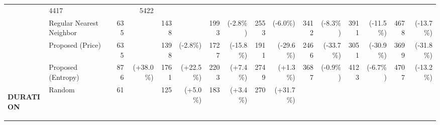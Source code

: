 \documentclass[onecolumn]{elsarticle}
\begin{document}
\begin{table}
{\begin{tabular}{l|l|r@{~}r|r@{~}r|r@{~}r|r@{~}r|r@{~}r|r@{~}r|r@{~}r|}
                                                    & \cellcolor{Gray}4417 & \cellcolor{Gray}
                                                    & \cellcolor{Gray}5422 & \cellcolor{Gray} \\
                        & Regular Nearest Neighbor  & 635  & 
                                                    & 1438 & 
                                                    & 1993 & {\color{green}(-2.8\%)} 
                                                    & 2553 & {\color{green}(-6.0\%)}
                                                    & 3412 & {\color{green}(-8.3\%)}
                                                    & 3911 & {\color{green}(-11.5\%)}
                                                    & 4678 & {\color{green}(-13.7\%)} \\
                                & Proposed (Price)   & 635  & 
                                                    & 1398 & {\color{green}(-2.8\%)}
                                                    & 1727 & {\color{green}(-15.8\%)}
                                                    & 1911 & {\color{green}(-29.6\%)}
                                                    & 2466 & {\color{green}(-33.7\%)}
                                                    & 3051 & {\color{green}(-30.9\%)}
                                                    & 3699 & {\color{green}(-31.8\%)} \\
                                & Proposed (Entropy)& 876 & {\color{red}(+38.0\%)} 
                                                    & 1761 & {\color{red}(+22.5\%)}
                                                    & 2203 & {\color{red}(+7.4\%)}
                                                    & 2749 & {\color{red}(+1.3\%)}
                                                    & 3687 & {\color{green}(-0.9\%)}
                                                    & 4123 & {\color{green}(-6.7\%)}
                                                    & 4707 & {\color{green}(-13.2\%)} \\ \hline
      \multirow{4}{*}{\begin{sideways}\hspace*{-4ex}\textbf{DURATION}\end{sideways}} 
                                & Random            & 61   & 
                                                    & 125  & {\color{red}(+5.0\%)} 
                                                    & 183  & {\color{red}(+3.4\%)} 
                                                    & 270  & {\color{red}(+31.7\%)} 

\end{tabular}}
\end{table}
\end{document}
